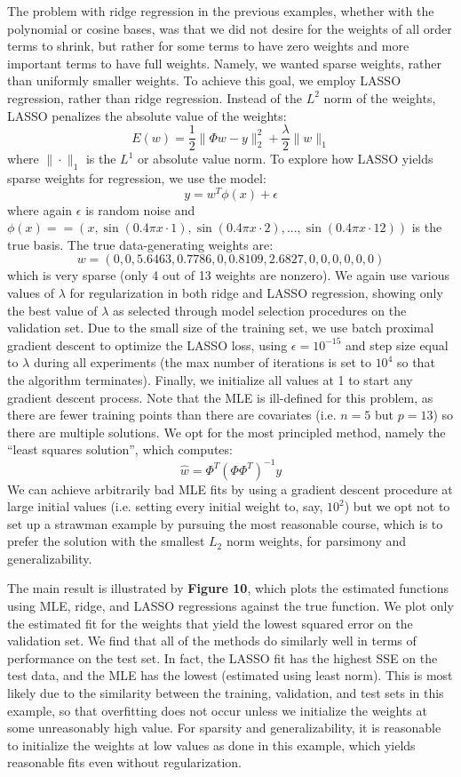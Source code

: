 \documentclass[10pt,psamsfonts]{amsart}
\theoremstyle{definition}
\theoremstyle{remark}
\numberwithin{equation}{section}
\begin{document}
The problem with ridge regression in the previous examples, whether with the polynomial or cosine bases, was that we did not desire for the weights of all order terms to shrink, but rather for some terms to have zero weights and more important terms to have full weights. Namely, we wanted sparse weights, rather than uniformly smaller weights. To achieve this goal, we employ LASSO regression, rather than ridge regression. Instead of the $L^2$ norm of the weights, LASSO penalizes the absolute value of the weights:
$$E(w) = \frac{1}{2}\|\Phi w-y\|_2^2 + \frac{\lambda}{2}\|w\|_1$$
where $\|\cdot\|_1$ is the $L^1$ or absolute value norm. To explore how LASSO yields sparse weights for regression, we use the model:
$$y = w^T\phi(x)  + \epsilon$$
where again $\epsilon$ is random noise and $\phi(x) = = (x,\sin(0.4\pi x \cdot1),\sin(0.4\pi x \cdot 2), . . . ,\sin(0.4\pi x \cdot 12))$ is the true basis. The true data-generating weights are: 
$$w = (0,0, 5.6463, 0.7786,0, 0.8109,2.6827, 0,0,0,0,0,0 )$$
which is very sparse (only 4 out of 13 weights are nonzero). We again use various values of $\lambda$ for regularization in both ridge and LASSO regression, showing only the best value of $\lambda$ as selected through model selection procedures on the validation set. Due to the small size of the training set, we use batch proximal gradient descent to optimize the LASSO loss, using $\epsilon = 10^{-15}$ and step size equal to $\lambda$ during all experiments (the max number of iterations is set to $10^{4}$ so that the algorithm terminates). Finally, we initialize all values at 1 to start any gradient descent process. Note that the MLE is ill-defined for this problem, as there are fewer training points than there are covariates (i.e. $n = 5$ but $p = 13$) so there are multiple solutions. We opt for the most principled method, namely the ``least squares solution'', which computes:
$$\hat{w} = \Phi^T(\Phi \Phi^T)^{-1} y$$
We can achieve arbitrarily bad MLE fits by using a gradient descent procedure at large initial values (i.e. setting every initial weight to, say, $10^2$) but we opt not to set up a strawman example by pursuing the most reasonable course, which is to prefer the solution with the smallest $L_2$ norm weights, for parsimony and generalizability.

The main result is illustrated by {\bf Figure 10}, which plots the estimated functions using MLE, ridge, and LASSO regressions against the true function. We plot only the estimated fit for the weights that yield the lowest squared error on the validation set. We find that all of the methods do similarly well in terms of performance on the test set. In fact, the LASSO fit has the highest SSE on the test data, and the MLE has the lowest (estimated using least norm). This is most likely due to the similarity between the training, validation, and test sets in this example, so that overfitting does not occur unless we initialize the weights at some unreasonably high value. For sparsity and generalizability, it is reasonable to initialize the weights at low values as done in this example, which yields reasonable fits even without regularization.
\end{document}
